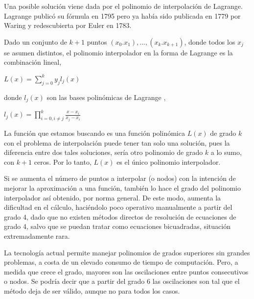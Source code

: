 \hspace{0.4cm} Una posible soluci\'on viene dada por el  polinomio de interpolaci\'on de Lagrange. Lagrange public\'o su f\'ormula en 1795 pero ya hab\'ia sido publicada en 1779 por Waring y redescubierta por Euler en 1783.

\hspace{0.4cm} Dado un conjunto de $k + 1$ puntos $(x_{0}.x_{1}),...,(x_{k}.x_{k+1})$, donde todos los $x_{j}$ se asumen distintos, el polinomio interpolador en la forma de Lagrange es la combinaci\'on lineal,

\begin{center}
$\displaystyle{L(x) = \sum_{j=0}^{k} y_{j} l_{j}(x)}$
\end{center}


\noindent donde $ l_{j}(x)$ son las bases polin\'omicas de Lagrange ,

\begin{center}
$\displaystyle{l_{j}(x) = \prod_{i=0,i \neq j}^{k} \frac{x-x_{i}}{x_{j}-x_{i}}  }$
\end{center}

\hspace{0.4cm} La funci\'on que estamos buscando es una funci\'on polin\'omica $L(x)$ de grado $k$ con el problema de interpolaci\'on puede tener tan solo una soluci\'on, pues la diferencia entre dos tales soluciones, ser\'ia otro polinomio de grado $k$ a lo sumo, con $k+1$ ceros. Por lo tanto, $L(x)$ es el \'unico polinomio interpolador.


\hspace{0.4cm} Si se aumenta el n\'umero de puntos a interpolar (o nodos) con la intenci\'on de mejorar la aproximaci\'on a una funci\'on, tambi\'en lo hace el grado del polinomio interpolador as\'i obtenido, por norma general. De este modo, aumenta la dificultad en el c\'alculo, haci\'endolo poco operativo manualmente a partir del grado 4, dado que no existen m\'etodos directos de resoluci\'on de ecuaciones de grado 4, salvo que se puedan tratar como ecuaciones bicuadradas, situaci\'on extremadamente rara.

\hspace{0.4cm} La tecnolog\'ia actual permite manejar polinomios de grados superiores sin grandes problemas, a costa de un elevado consumo de tiempo de computaci\'on. Pero, a medida que crece el grado, mayores son las oscilaciones entre puntos consecutivos o nodos. Se podr\'ia decir que a partir del grado 6 las oscilaciones son tal que el m\'etodo deja de ser v\'alido, aunque no para todos los casos.

